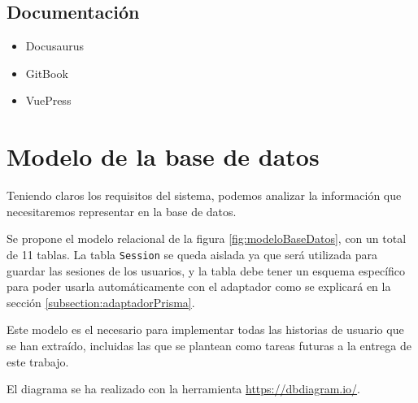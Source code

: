 \subsection{Documentación}\label{subsection:decisionDocumentacion}
\begin{itemize}
    \item Docusaurus
    \item GitBook
    \item VuePress
\end{itemize}


\section{Modelo de la base de datos}

Teniendo claros los requisitos del sistema, podemos analizar la información que necesitaremos representar en la base de datos.

Se propone el modelo relacional de la figura \ref{fig:modeloBaseDatos}, con un total de 11 tablas. La tabla \texttt{Session} se queda aislada ya que será utilizada para guardar las sesiones de los usuarios, y la tabla debe tener un esquema específico para poder usarla automáticamente con el adaptador como se explicará en la sección \ref{subsection:adaptadorPrisma}.

Este modelo es el necesario para implementar todas las historias de usuario que se han extraído, incluidas las que se plantean como tareas futuras a la entrega de este trabajo.

El diagrama se ha realizado con la herramienta \url{https://dbdiagram.io/}.

